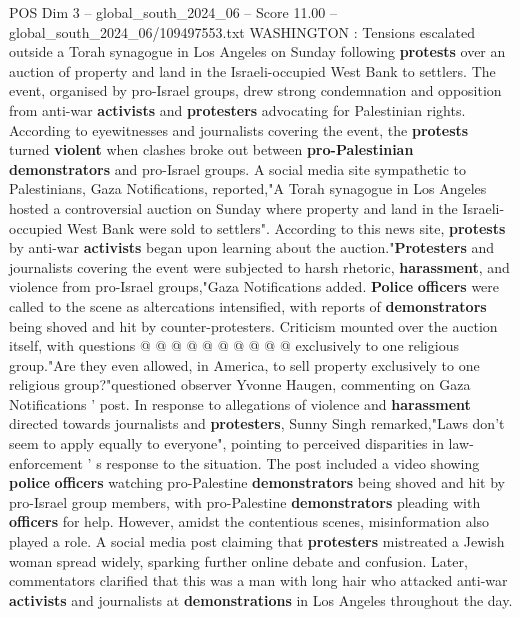 \begin{textsample}{POS Dim 3 – global\_south\_2024\_06 – Score 11.00 – global\_south\_2024\_06/109497553.txt}  \label{ex:f3_pos_341}
WASHINGTON : Tensions escalated outside a Torah synagogue in Los Angeles on Sunday following \textbf{protests} over an auction of property and land in the Israeli-occupied West Bank to settlers.
The event, organised by pro-Israel groups, drew strong condemnation and opposition from anti-war \textbf{activists} and \textbf{protesters} advocating for Palestinian rights.
According to eyewitnesses and journalists covering the event, the \textbf{protests} turned \textbf{violent} when clashes broke out between \textbf{pro-Palestinian} \textbf{demonstrators} and pro-Israel groups.
A social media site sympathetic to Palestinians, Gaza Notifications, reported,"A Torah synagogue in Los Angeles hosted a controversial auction on Sunday where property and land in the Israeli-occupied West Bank were sold to settlers".
According to this news site, \textbf{protests} by anti-war \textbf{activists} began upon learning about the auction."\textbf{Protesters} and journalists covering the event were subjected to harsh rhetoric, \textbf{harassment}, and violence from pro-Israel groups,"Gaza Notifications added. \textbf{Police} \textbf{officers} were called to the scene as altercations intensified, with reports of \textbf{demonstrators} being shoved and hit by counter-protesters.
Criticism mounted over the auction itself, with questions @ @ @ @ @ @ @ @ @ @ exclusively to one religious group."Are they even allowed, in America, to sell property exclusively to one religious group?"questioned observer Yvonne Haugen, commenting on Gaza Notifications ' post.
In response to allegations of violence and \textbf{harassment} directed towards journalists and \textbf{protesters}, Sunny Singh remarked,"Laws don't seem to apply equally to everyone", pointing to perceived disparities in law-enforcement ' s response to the situation.
The post included a video showing \textbf{police} \textbf{officers} watching pro-Palestine \textbf{demonstrators} being shoved and hit by pro-Israel group members, with pro-Palestine \textbf{demonstrators} pleading with \textbf{officers} for help.
However, amidst the contentious scenes, misinformation also played a role.
A social media post claiming that \textbf{protesters} mistreated a Jewish woman spread widely, sparking further online debate and confusion.
Later, commentators clarified that this was a man with long hair who attacked anti-war \textbf{activists} and journalists at \textbf{demonstrations} in Los Angeles throughout the day.

\end{textsample}
